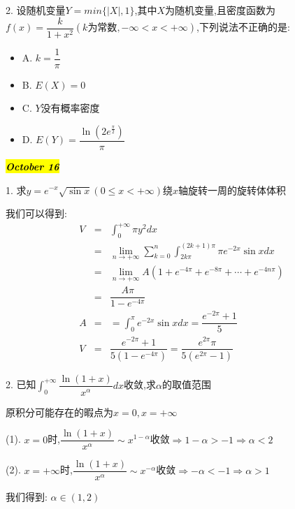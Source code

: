 2. 设随机变量$Y=min\{|X|,1\}$,其中$X$为随机变量,且密度函数为$f(x)=\dfrac{k}{1+x^2}(k\text{为常数},-\infty<x<+\infty)$,下列说法不正确的是:  
\begin{itemize}
	\item A. $k=\dfrac{1}{\pi}$
	\item B. $E(X)=0$
	\item C. $Y$没有概率密度
	\item D. $E(Y)=\dfrac{\ln(2e^{\frac{\pi}{2}})}{\pi}$
\end{itemize}
\begin{solution}
	
\end{solution}

\hl{\textbf{\textit{October 16}}}

1. 求$y=e^{-x}\sqrt{\sin x}(0\leq x<+\infty)$绕$x$轴旋转一周的旋转体体积
\begin{solution}

	我们可以得到:  
	\begin{eqnarray*}
		V&=&\int_{0}^{+\infty}\pi y^2dx\\
		&=&\lim\limits_{n\rightarrow+\infty}\sum\limits_{k=0}^{n}\int_{2k\pi}^{(2k+1)\pi}\pi e^{-2x}\sin xdx\\
		&=&\lim\limits_{n\rightarrow+\infty}A(1+e^{-4\pi}+e^{-8\pi}+\cdots+e^{-4n\pi})\\
		&=&\dfrac{A\pi}{1-e^{-4\pi}}\\
		A&=&=\int_{0}^{\pi}e^{-2x}\sin xdx=\dfrac{e^{-2\pi}+1}{5}\\
		V&=&\dfrac{e^{-2\pi}+1}{5(1-e^{-4\pi})}=\dfrac{e^{2\pi}\pi}{5(e^{2\pi}-1)}
	\end{eqnarray*}
\end{solution}

2. 已知$\int_{0}^{+\infty}\dfrac{\ln(1+x)}{x^{\alpha}}dx$收敛,求$\alpha$的取值范围

\begin{solution}

	原积分可能存在的暇点为$x=0,x=+\infty$
	
	(1). $x=0$时,$\dfrac{\ln(1+x)}{x^{\alpha}}\sim x^{1-\alpha}$收敛$\Rightarrow 1-\alpha>-1\Rightarrow \alpha<2$
	
	(2). $x=+\infty$时,$\dfrac{\ln(1+x)}{x^{\alpha}}\sim x^{-\alpha}$收敛$\Rightarrow -\alpha<-1\Rightarrow \alpha>1$
	
	我们得到:  $\alpha\in(1,2)$
\end{solution}

